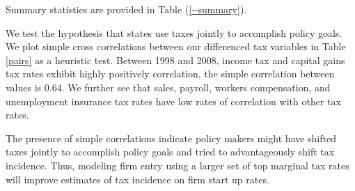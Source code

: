 Summary statistics are provided in Table (\ref{--summary}).

We test the hypothesis that states use taxes jointly to accomplish policy goals. We plot simple cross correlations between our differenced tax variables in Table \ref{pairs} as a heuristic test. Between 1998 and 2008, income tax and capital gains tax rates exhibit highly positively correlation, the simple correlation between values is 0.64. We further see that sales, payroll, workers compensation, and unemployment insurance tax rates have low rates of correlation with other tax rates. 

The presence of simple correlations indicate policy makers might have shifted taxes jointly to accomplish policy goals and tried to advantageously shift tax incidence. Thus, modeling firm entry using a larger set of top marginal tax rates will improve estimates of tax incidence on firm start up rates.